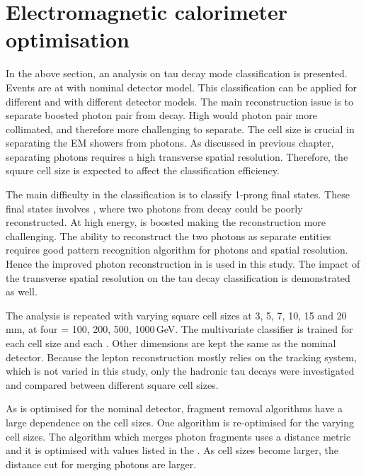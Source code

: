 \section{Electromagnetic calorimeter  optimisation}
\label{sec:tauECAL}
In the above section, an analysis on tau decay mode classification is presented. Events are \eeToTauTau at  with nominal \ILD detector model. This classification can be applied for different  \sqrtS and with different detector models. The main reconstruction issue is to separate boosted photon pair from \Ppizero decay. High \sqrtS would photon pair more collimated, and therefore more challenging to separate. The \ECAL cell size is crucial in separating the EM showers from photons. As discussed in previous chapter, separating photons requires a high transverse spatial resolution. Therefore, the \ECAL square cell size is expected to affect the classification efficiency.

The main difficulty in the classification is to classify 1-prong final states.  These final states involves \Ppizero, where two photons from \Ppizero decay could be poorly reconstructed. At high energy, \Ppizero is boosted making the reconstruction more challenging. The ability to reconstruct the two photons as separate entities requires good pattern recognition algorithm for photons and \ECAL spatial resolution. Hence the improved photon reconstruction in  is used in this study. The impact of the \ECAL transverse spatial resolution on the tau decay classification is demonstrated as well.

The analysis is repeated with varying \ECAL square cell sizes at 3, 5, 7, 10, 15 and 20\,mm, at four  \sqrtS = 100, 200, 500, 1000\,GeV. The multivariate classifier is trained for each cell size and each \sqrtS. Other \ECAL dimensions are kept the same as the \ILD nominal detector. Because the lepton reconstruction mostly relies on the tracking system, which is not varied in this study, only the  hadronic tau decays were investigated and compared between different \ECAL square cell sizes.


As \pandora is optimised for the nominal \ILD detector, fragment removal algorithms have a large dependence on the \ECAL cell sizes. One algorithm is re-optimised for the varying \ECAL cell sizes. The \PhotonFragmentRemoval algorithm which merges photon fragments uses a distance metric and it is optimised with values listed in the . As cell sizes become larger, the distance cut for merging photons are larger.



